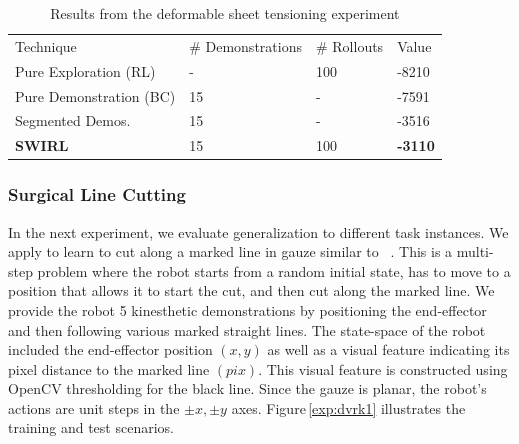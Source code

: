 \begin{table}[ht!]
\centering
\scriptsize
\caption{Results from the deformable sheet tensioning experiment}
\label{my-label}
\begin{tabular}{llll}
\rowcolor[HTML]{000000} 
{\color[HTML]{FFFFFF} Technique} & {\color[HTML]{FFFFFF} \# Demonstrations} & {\color[HTML]{FFFFFF} \# Rollouts} & {\color[HTML]{FFFFFF} Value} \\
Pure Exploration (RL)                   & -                                        & 100                                & -8210                        \\
Pure Demonstration  (BC)                            & 15                                       & -                                  & -7591                        \\
Segmented Demos.                  & 15                                       & -                                  & -3516                        \\
\textbf{SWIRL}                  & 15                                       & 100                                & \textbf{-3110}                    
\end{tabular}
\end{table}


\subsubsection{Surgical Line Cutting}
In the next experiment, we evaluate generalization to different task instances.
We apply \hirl to learn to cut along a marked line in gauze similar to ~\cite{murali2015learning}.
This is a multi-step problem where the robot starts from a random initial state, has to move to a position that allows it to start the cut, and then cut along the marked line.
We provide the robot 5 kinesthetic demonstrations by positioning the end-effector and then following various marked straight lines.
The state-space of the robot included the end-effector position $(x,y)$ as well as a visual feature indicating its pixel distance to the marked line $(pix)$.
This visual feature is constructed using OpenCV thresholding for the black line.
Since the gauze is planar, the robot's actions are unit steps in the $\pm x, \pm y$ axes.
Figure\,\ref{exp:dvrk1} illustrates the training and test scenarios.


